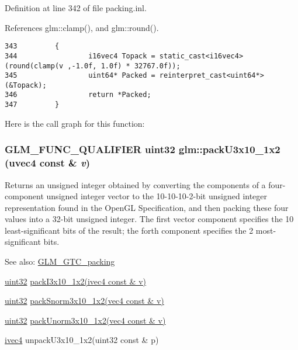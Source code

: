 Definition at line 342 of file packing.inl.

References glm::clamp(), and glm::round().

\begin{Code}\begin{verbatim}343         {
344                 i16vec4 Topack = static_cast<i16vec4>(round(clamp(v ,-1.0f, 1.0f) * 32767.0f));
345                 uint64* Packed = reinterpret_cast<uint64*>(&Topack);
346                 return *Packed;
347         }
\end{verbatim}
\end{Code}




Here is the call graph for this function:\hypertarget{group__gtc__packing_gf656d8862628f96b20de7a36eaa1fe56}{
\subsubsection[packU3x10\_\-1x2]{\setlength{\rightskip}{0pt plus 5cm}GLM\_\-FUNC\_\-QUALIFIER uint32 glm::packU3x10\_\-1x2 (uvec4 const \& {\em v})}}
\label{group__gtc__packing_gf656d8862628f96b20de7a36eaa1fe56}


Returns an unsigned integer obtained by converting the components of a four-component unsigned integer vector to the 10-10-10-2-bit unsigned integer representation found in the OpenGL Specification, and then packing these four values into a 32-bit unsigned integer. The first vector component specifies the 10 least-significant bits of the result; the forth component specifies the 2 most-significant bits.

\begin{Desc}
\item[See also:]\hyperlink{group__gtc__packing}{GLM\_\-GTC\_\-packing} 

\hyperlink{group__gtc__type__precision_g202b6a53c105fcb7e531f9b443518451}{uint32} \hyperlink{group__gtc__packing_g032e18fa5bc5b8f3897104aeb2f1e195}{packI3x10\_\-1x2(ivec4 const \& v)} 

\hyperlink{group__gtc__type__precision_g202b6a53c105fcb7e531f9b443518451}{uint32} \hyperlink{group__gtc__packing_g0d4157cec37c0312216a7be1cc92df54}{packSnorm3x10\_\-1x2(vec4 const \& v)} 

\hyperlink{group__gtc__type__precision_g202b6a53c105fcb7e531f9b443518451}{uint32} \hyperlink{group__gtc__packing_g2cf2d11b40bd48639110456fd74c2e33}{packUnorm3x10\_\-1x2(vec4 const \& v)} 

\hyperlink{group__core__types_ga4560ddc50320ea8f8a70d5c9c249fea}{ivec4} unpackU3x10\_\-1x2(uint32 const \& p) \end{Desc}



